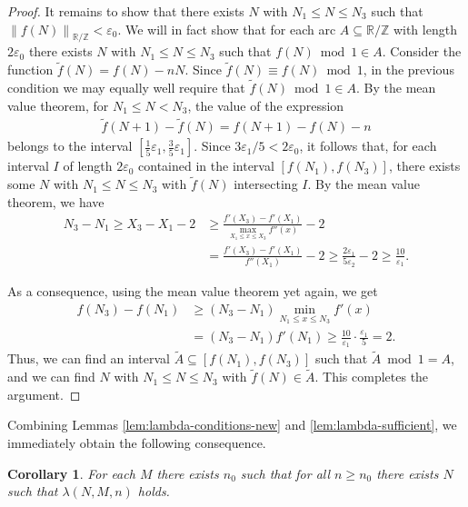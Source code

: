\documentclass{amsart}
\newtheorem{corollary}[theorem]{Corollary}
\theoremstyle{definition}
\newcommand{\fpa}[1]{\left\lVert #1 \right\rVert_{\RR/\ZZ}}
\newcommand{\e}{\varepsilon}
\newcommand{\ZZ}{\mathbb{Z}}
\newcommand{\RR}{\mathbb{R}}
\renewcommand{\subset}{\subseteq}
\begin{document}
\begin{proof}
It remains to show that there exists $N$ with $N_1 \leq N \leq N_3$ such that $\fpa{f(N)} < \e_0$. We will in fact show that for each arc $A \subset \RR/\ZZ$ with length $2\e_0$ there exists $N$ with $N_1 \leq N \leq N_3$ such that $f(N) \bmod 1 \in A$. Consider the function $\tilde f(N) = f(N) - nN$. Since $\tilde f(N) \equiv f(N) \bmod 1$, in the previous condition we may equally well require that $\tilde f(N) \bmod 1 \in A$. By the mean value theorem, for $N_1 \leq N < N_3$, the value of the expression 
\begin{align*}
	\tilde f(N+1) - \tilde f(N) = f(N+1) - f(N) - n 
\end{align*}
belongs to the interval $\left[\frac{1}{5} \e_1, \frac{3}{5} \e_1 \right]$.
Since $3\e_1/5 < 2\e_0$, it follows that, for each interval $I$ of length $2\e_0$ contained in the interval $[f(N_1),f(N_3)]$, there exists some $N$ with $N_1 \leq N \leq N_3$ with $\tilde f(N)$ intersecting $I$. By the mean value theorem, we have 
\begin{align*}
	N_3 - N_1 \geq X_3 - X_1 - 2 &\geq 
	\frac{f'(X_3) - f'(X_1)}{\max_{X_1 \leq x \leq X_3} f''(x) } - 2 \\
	&= \frac{f'(X_3) - f'(X_1)}{ f''(X_1) } - 2 \geq  \frac{2\e_1}{5\e_2} - 2 \geq \frac{10}{\e_1}.
\end{align*}
 
As a consequence, using the mean value theorem yet again, we get
\begin{align*}
	f(N_3) - f(N_1) &\geq (N_3-N_1) \min_{N_1 \leq x \leq N_3} f'(x) 
	\\ & = (N_3-N_1) f'(N_1) 
	\geq \frac{10}{\e_1} \cdot \frac{\e_1}{5} = 2.
\end{align*}
	Thus, we can find an interval $\tilde A \subset [f(N_1),f(N_3)]$ such that $\tilde A \bmod 1 = A$, and we can find $N$ with $N_1 \leq N \leq N_3$ with $\tilde f(N) \in \tilde A$. This completes the argument.
\end{proof}

Combining Lemmas \ref{lem:lambda-conditions-new} and \ref{lem:lambda-sufficient}, we immediately obtain the following consequence.

\begin{corollary}\label{cor:lambda-existence}
For each $M$ there exists $n_0$ such that for all $n \geq n_0$ there exists $N$ such that $\lambda(N,M,n)$ holds.
\end{corollary}
\end{document}

